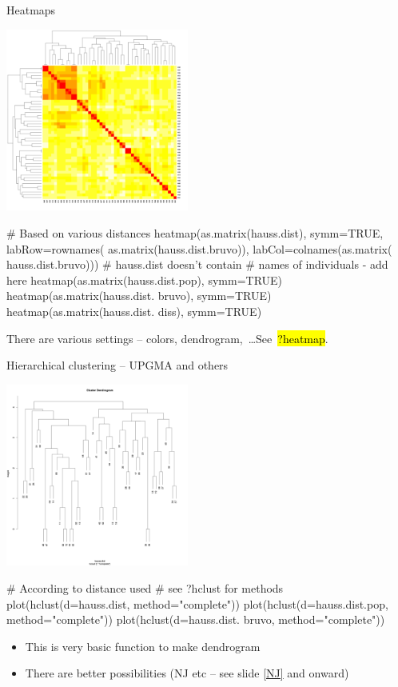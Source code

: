 \documentclass[compress, ucs, xelatex, 11pt, xcolor=svgnames,
  hyperref={
    bookmarks=true,
    unicode=true,
    colorlinks=true,
    pdftitle={Molecular data in R},
    plainpages=false,
    pdfauthor={Vojtech Zeisek},
    pdfsubject={Course about phylogeny and evolution in R},
    pdfcreator={XeLaTeX},
    pdfkeywords={R, evolution, phylogeny, molecular data},
    linkcolor=Tomato,
    anchorcolor=SaddleBrown,
    citecolor=Goldenrod,
    filecolor=DarkMagenta,
    menucolor=Sienna,
    urlcolor=DarkTurquoise,
    pdftex},
  url={hyphens, lowtilde} %
  ]{beamer}
\renewcommand{\texttt}[1]{\hl{\ttfamily #1}}
\begin{document}
\begin{frame}[fragile]{Heatmaps}
\label{hierclust}
\begin{multicols}{2}
  \includegraphics[height=6cm]{heatmap.png}
  \columnbreak
  \begin{spluscode}
    # Based on various distances
    heatmap(as.matrix(hauss.dist),
      symm=TRUE, labRow=rownames(
      as.matrix(hauss.dist.bruvo)),
      labCol=colnames(as.matrix(
      hauss.dist.bruvo)))
      # hauss.dist doesn't contain
      # names of individuals - add here
    heatmap(as.matrix(hauss.dist.pop),
      symm=TRUE)
    heatmap(as.matrix(hauss.dist.
      bruvo), symm=TRUE)
    heatmap(as.matrix(hauss.dist.
      diss), symm=TRUE)
  \end{spluscode}
  \begin{footnotesize}
  There are various settings -- colors, dendrogram,~\ldots See~\texttt{?heatmap}.
  \end{footnotesize}
\end{multicols}
\end{frame}

\begin{frame}[fragile]{Hierarchical clustering -- UPGMA and others}
\begin{multicols}{2}
  \includegraphics[height=6cm]{hierclust.png}
  \begin{spluscode}
    # According to distance used
    # see ?hclust for methods
    plot(hclust(d=hauss.dist,
      method="complete"))
    plot(hclust(d=hauss.dist.pop,
      method="complete"))
    plot(hclust(d=hauss.dist.
      bruvo, method="complete"))
  \end{spluscode}
  \vfil
  \begin{itemize}
    \item This is very basic function to make dendrogram
    \item There are better possibilities (NJ etc -- see slide \ref{NJ} and onward)
  \end{itemize}
\end{multicols}
\end{frame}
\end{document}
